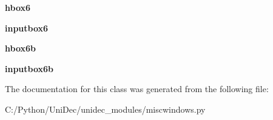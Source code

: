 \begin{DoxyCompactItemize}
\item 
\hypertarget{class_uni_dec_1_1unidec__modules_1_1miscwindows_1_1_additional_parameters_a1a28bc5037034be1dbebe2e86983fae1}{}{\bfseries hbox6}\label{class_uni_dec_1_1unidec__modules_1_1miscwindows_1_1_additional_parameters_a1a28bc5037034be1dbebe2e86983fae1}

\item 
\hypertarget{class_uni_dec_1_1unidec__modules_1_1miscwindows_1_1_additional_parameters_a6e07b428156d67cc970cf8125f1b97f1}{}{\bfseries inputbox6}\label{class_uni_dec_1_1unidec__modules_1_1miscwindows_1_1_additional_parameters_a6e07b428156d67cc970cf8125f1b97f1}

\item 
\hypertarget{class_uni_dec_1_1unidec__modules_1_1miscwindows_1_1_additional_parameters_a0ff189dc4e49d693939eed341da417a3}{}{\bfseries hbox6b}\label{class_uni_dec_1_1unidec__modules_1_1miscwindows_1_1_additional_parameters_a0ff189dc4e49d693939eed341da417a3}

\item 
\hypertarget{class_uni_dec_1_1unidec__modules_1_1miscwindows_1_1_additional_parameters_aa3e24d64bf0af57383e955787aa254d6}{}{\bfseries inputbox6b}\label{class_uni_dec_1_1unidec__modules_1_1miscwindows_1_1_additional_parameters_aa3e24d64bf0af57383e955787aa254d6}

\end{DoxyCompactItemize}


The documentation for this class was generated from the following file\+:\begin{DoxyCompactItemize}
\item 
C\+:/\+Python/\+Uni\+Dec/unidec\+\_\+modules/miscwindows.\+py\end{DoxyCompactItemize}
